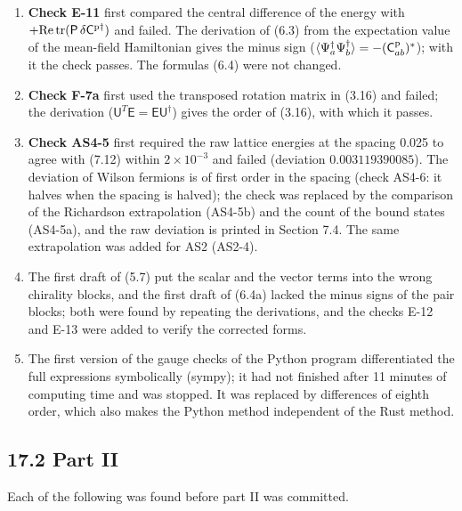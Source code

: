 \documentclass[
  10pt,
]{article}
\providecommand{\tightlist}{%
  \setlength{\itemsep}{0pt}\setlength{\parskip}{0pt}}
\begin{document}
\begin{enumerate}
\def\labelenumi{\arabic{enumi}.}
\tightlist
\item
  \textbf{Check E-11} first compared the central difference of the
  energy with
  \(+\mathrm{Re}\,\mathrm{tr}(\mathsf P\,\delta\mathsf C^{\rm p\dagger})\)
  and failed. The derivation of (6.3) from the expectation value of the
  mean-field Hamiltonian gives the minus sign
  (\(\langle\Psi^\dagger_a\Psi^\dagger_b\rangle=-(\mathsf C^{\rm p}_{ab})^*\));
  with it the check passes. The formulas (6.4) were not changed.
\item
  \textbf{Check F-7a} first used the transposed rotation matrix in
  (3.16) and failed; the derivation
  (\(\mathsf U^T\mathsf E=\mathsf E\mathsf U^\dagger\)) gives the order
  of (3.16), with which it passes.
\item
  \textbf{Check AS4-5} first required the raw lattice energies at the
  spacing 0.025 to agree with (7.12) within \(2\times10^{-3}\) and
  failed (deviation \(0.003119390085\)). The deviation of Wilson
  fermions is of first order in the spacing (check AS4-6: it halves when
  the spacing is halved); the check was replaced by the comparison of
  the Richardson extrapolation (AS4-5b) and the count of the bound
  states (AS4-5a), and the raw deviation is printed in Section 7.4. The
  same extrapolation was added for AS2 (AS2-4).
\item
  The first draft of (5.7) put the scalar and the vector terms into the
  wrong chirality blocks, and the first draft of (6.4a) lacked the minus
  signs of the pair blocks; both were found by repeating the
  derivations, and the checks E-12 and E-13 were added to verify the
  corrected forms.
\item
  The first version of the gauge checks of the Python program
  differentiated the full expressions symbolically (sympy); it had not
  finished after 11 minutes of computing time and was stopped. It was
  replaced by differences of eighth order, which also makes the Python
  method independent of the Rust method.
\end{enumerate}

\hypertarget{part-ii}{%
\subsection{17.2 Part II}\label{part-ii}}

Each of the following was found before part II was committed.
\end{document}
